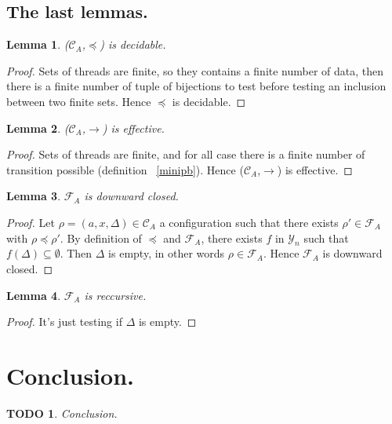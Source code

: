 \documentclass[a4paper,10pt]{report}
\newtheorem{lm}{Lemma}[thr]
\newtheorem{td}{TODO}
\newcommand{\C}{\mathcal{C}_{A}}
\newcommand{\F}{\mathcal{F}_{A}}
\newcommand{\Y}{\mathcal{Y}_{n}}
\begin{document}
\subsection{The last lemmas.}
\begin{lm} \label{cd2}
  ($\C$,$\preceq$) is decidable.
\end{lm}
\begin{proof}
  Sets of threads are finite, so they contains a finite number of data, then there is a finite number of tuple of bijections to test before testing an inclusion between two finite sets.
  Hence $\preceq$ is decidable.
\end{proof}

\begin{lm} \label{cd3}
  ($\C$,$\rightarrow$) is effective.
\end{lm}

\begin{proof}
   Sets of threads are finite, and for all case there is a finite number of transition possible (definition ~\ref{minipb}).
   Hence ($\C$,$\rightarrow$) is effective.
\end{proof}


\begin{lm} \label{cd5}
  $\F$ is downward closed. 
\end{lm}
\begin{proof}
  Let $\rho=(a,x,\Delta) \in \C$ a configuration such that there exists $\rho' \in \F$ with $\rho \preceq \rho'$.
  By definition of $\preceq$ and $\F$, there exists $f$ in $\Y$ such that $f(\Delta) \subseteq \emptyset$.
  Then $\Delta$ is empty, in other words $\rho \in \F$.
  Hence $\F$ is downward closed. 
\end{proof}

\begin{lm} \label{cd6}
  $\F$ is reccursive.
\end{lm}

\begin{proof}
  It's just testing if $\Delta$ is empty.
\end{proof}

\section{Conclusion.}
\begin{td}
 Conclusion.
\end{td}
\end{document}
